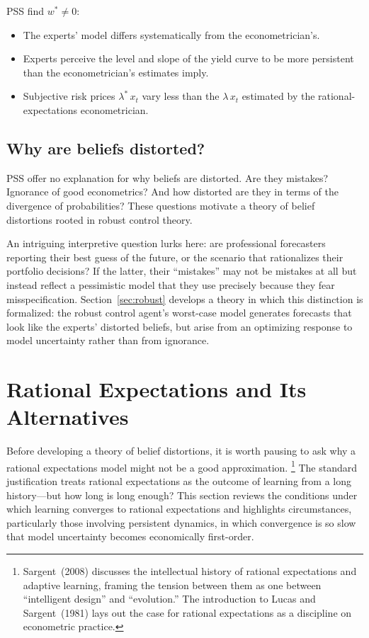 \documentclass[12pt]{article}
\theoremstyle{definition}
\begin{document}
PSS find $w^* \neq 0$:
\begin{itemize}
\item The experts' model differs systematically from the
      econometrician's.
\item Experts perceive the level and slope of the yield curve to be more
      persistent than the econometrician's estimates imply.
\item Subjective risk prices $\lambda^*\, x_t$ vary less than the
      $\lambda\, x_t$ estimated by the rational-expectations
      econometrician.
\end{itemize}

\subsection{Why are beliefs distorted?}

PSS offer no explanation for why beliefs are distorted.  Are they
mistakes?  Ignorance of good econometrics?  And how distorted are they
in terms of the divergence of probabilities?  These questions motivate a
theory of belief distortions rooted in robust control theory.

An intriguing interpretive question lurks here: are professional
forecasters reporting their best guess of the future, or the scenario
that rationalizes their portfolio decisions?  If the latter, their
``mistakes'' may not be mistakes at all but instead reflect a
pessimistic model that they use precisely because they fear
misspecification.  Section~\ref{sec:robust} develops a theory in which
this distinction is formalized: the robust control agent's worst-case
model generates forecasts that look like the experts' distorted beliefs,
but arise from an optimizing response to model uncertainty rather than
from ignorance.


\section{Rational Expectations and Its Alternatives}
\label{sec:RE-limits}

Before developing a theory of belief distortions, it is worth pausing to
ask why a rational expectations model might not be a good approximation.%
\footnote{Sargent~(2008) discusses the intellectual history of rational
expectations and adaptive learning, framing the tension between them as
one between ``intelligent design'' and ``evolution.''  The introduction
to Lucas and Sargent~(1981) lays out the case for rational expectations
as a discipline on econometric practice.}
The standard justification treats rational expectations as the outcome
of learning from a long history---but how long is long enough?  This
section reviews the conditions under which learning converges to
rational expectations and highlights circumstances, particularly those
involving persistent dynamics, in which convergence is so slow that
model uncertainty becomes economically first-order.
\end{document}

